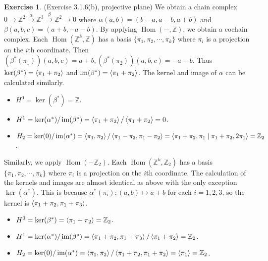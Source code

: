 \documentclass[12pt, psamsfonts]{amsart}
\theoremstyle{definition}
\newtheorem*{exer}{Exercise}
\theoremstyle{remark}
\DeclareMathOperator{\Hom}{Hom}
\DeclareMathOperator{\im}{im}
\numberwithin{equation}{section}
\begin{document}
\begin{exer}{(Exercise 3.1.6(b), projective plane)}
  We obtain a chain complex $0 \rightarrow \mathbb{Z}^2 \xrightarrow{\alpha} \mathbb{Z}^3 \xrightarrow{\beta} \mathbb{Z}^2 \rightarrow 0$ where $\alpha(a, b) = (b - a, a - b, a + b)$ and $\beta(a, b, c) = (a + b, -a - b)$.
  By applying $\Hom(-, \mathbb{Z})$, we obtain a cochain complex.
  Each $\Hom(\mathbb{Z}^k, \mathbb{Z})$ has a basis $\{ \pi_1, \pi_2, \cdots, \pi_k \}$ where $\pi_i$ is a projection on the $i$th coordinate.
  Then $(\beta^{\ast}(\pi_1))(a, b, c) = a + b, (\beta^{\ast}(\pi_2))(a, b, c) = -a - b$.
  Thus $\ker(\beta^{\ast}) = \ev{ \pi_1 + \pi_2 }$ and $\im(\beta^{\ast}) = \ev{\pi_1 + \pi_2}$.
  The kernel and image of $\alpha$ can be calculated similarly.
  \begin{itemize}
    \item
      $H^0 = \ker(\beta^{\ast}) = \mathbb{Z}$.
    \item
      $H^1 = \ker(\alpha^{\ast}) / \im(\beta^{\ast}) = \ev{\pi_1 + \pi_2} / \ev{\pi_1 + \pi_2} = 0$.
    \item
      $H_2 = \ker(0) / \im(\alpha^{\ast}) = \ev{\pi_1, \pi_2} / \ev{\pi_1 - \pi_2, \pi_1 - \pi_2} = \ev{\pi_1 + \pi_2, \pi_1 \mid \pi_1 + \pi_2, 2\pi_1} = \mathbb{Z}_2$.
  \end{itemize}

  Similarly, we apply $\Hom(-\mathbb{Z}_2)$.
  Each $\Hom(\mathbb{Z}^k, \mathbb{Z}_2)$ has a basis $\{ \pi_1, \pi_2, \cdots, \pi_k \}$ where $\pi_i$ is a projection on the $i$th coordinate.
  The calculation of the kernels and images are almost identical as above with the only exception $\ker(\alpha^{\ast})$.
  This is because $\alpha^{\ast}(\pi_i) : (a, b) \mapsto a + b$ for each $i = 1, 2, 3$, so the kernel is $\ev{ \pi_1 + \pi_2, \pi_1 + \pi_3 }$.
  \begin{itemize}
    \item
      $H^0 = \ker(\beta^{\ast}) = \ev{\pi_1 + \pi_2} = \mathbb{Z}_2$.
    \item
      $H^1 = \ker(\alpha^{\ast}) / \im(\beta^{\ast}) = \ev{\pi_1 + \pi_2, \pi_1 + \pi_3} / \ev{\pi_1 + \pi_2} = \mathbb{Z}_2$.
    \item
      $H_2 = \ker(0) / \im(\alpha^{\ast}) = \ev{\pi_1, \pi_2} / \ev{\pi_1 + \pi_2, \pi_1 + \pi_2} = \ev{\pi_1} = \mathbb{Z}_2$.
  \end{itemize}
\end{exer}
\end{document}

